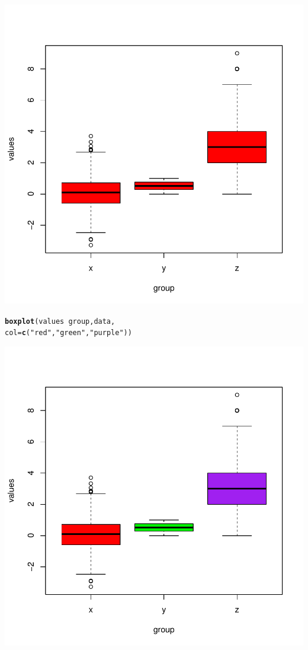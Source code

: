 \documentclass{article}\usepackage[]{graphicx}\usepackage[]{xcolor}
\makeatletter
\def\maxwidth{ %
  \ifdim\Gin@nat@width>\linewidth
    \linewidth
  \else
    \Gin@nat@width
  \fi
}
\newcommand{\hlstr}[1]{\textcolor[rgb]{0.192,0.494,0.8}{#1}}%
\newcommand{\hlopt}[1]{\textcolor[rgb]{0,0,0}{#1}}%
\newcommand{\hlstd}[1]{\textcolor[rgb]{0.345,0.345,0.345}{#1}}%
\newcommand{\hlkwc}[1]{\textcolor[rgb]{0.333,0.667,0.333}{#1}}%
\newcommand{\hlkwd}[1]{\textcolor[rgb]{0.737,0.353,0.396}{\textbf{#1}}}%
\newenvironment{kframe}{%
 \def\at@end@of@kframe{}%
 \ifinner\ifhmode%
  \def\at@end@of@kframe{\end{minipage}}%
  \begin{minipage}{\columnwidth}%
 \fi\fi%
 \def\FrameCommand##1{\hskip\@totalleftmargin \hskip-\fboxsep
 \colorbox{shadecolor}{##1}\hskip-\fboxsep
     \hskip-\linewidth \hskip-\@totalleftmargin \hskip\columnwidth}%
 \MakeFramed {\advance\hsize-\width
   \@totalleftmargin\z@ \linewidth\hsize
   \@setminipage}}%
 {\par\unskip\endMakeFramed%
 \at@end@of@kframe}
\newenvironment{knitrout}{}{} %
\makeatother
\begin{document}
\begin{knitrout}
{\centering \includegraphics[width=\maxwidth]{figure/unnamed-chunk-1-6} 

}


\begin{kframe}\begin{alltt}
\hlkwd{boxplot}\hlstd{(values} \hlopt{~} \hlstd{group, data,}
        \hlkwc{col} \hlstd{=} \hlkwd{c}\hlstd{(}\hlstr{"red"}\hlstd{,}\hlstr{"green"}\hlstd{,}\hlstr{"purple"}\hlstd{))}
\end{alltt}
\end{kframe}

{\centering \includegraphics[width=\maxwidth]{figure/unnamed-chunk-1-7} 

}
\end{knitrout}
\end{document}
